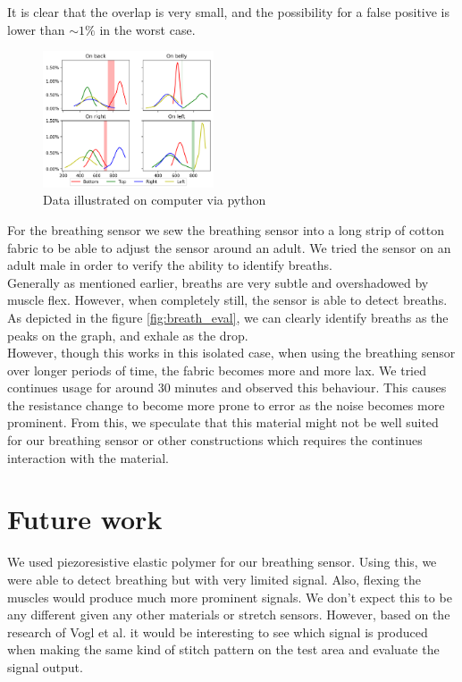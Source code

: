 \documentclass{sigchi-ext}
\begin{document}
It is clear that the overlap is very small, and the possibility for a false positive is lower than $\sim1\%$ in the worst case.
\begin{figure}
   \centering \includegraphics[width=0.45\textwidth]{img/sensor_test}
    \caption{Data illustrated on computer via python}
    \label{fig:testsensorsgraph}
\end{figure}

For the breathing sensor we sew the breathing sensor into
a long strip of cotton fabric to be able to adjust the 
sensor around an adult. We tried the sensor on an 
adult male in order to verify the ability to identify 
breaths.\\
Generally as mentioned earlier, breaths are very subtle and
overshadowed by muscle flex. However, when completely still,
the sensor is able to detect breaths. As depicted in the figure \ref{fig:breath_eval},
we can clearly identify breaths as the peaks on the graph, and exhale as
the drop.\\
However, though this works in this isolated case, when using the breathing sensor
over longer periods of time, the fabric becomes more and more lax. We 
tried continues usage for around 30 minutes and observed this behaviour. This causes the resistance
change to become more prone to error as the noise becomes more prominent. From this, we speculate
that this material might not be well suited for our breathing sensor or other constructions which
requires the continues interaction with the material.

\section{Future work}
We used piezoresistive elastic polymer for our breathing sensor. Using this,
we were able to detect breathing but with very limited signal. Also, flexing the muscles
would produce much more prominent signals. We don't expect this to be any
different given any other materials or stretch sensors. However,
based on the research of Vogl et al. \cite{stretcheband} it would be interesting
to see which signal is produced when making the same kind of stitch pattern on
the test area and evaluate the signal output.
\end{document}
